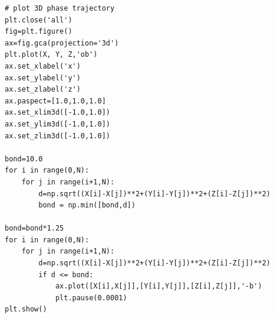 \begin{verbatim}
# plot 3D phase trajectory
plt.close('all')
fig=plt.figure()
ax=fig.gca(projection='3d')
plt.plot(X, Y, Z,'ob')
ax.set_xlabel('x')
ax.set_ylabel('y')
ax.set_zlabel('z')
ax.paspect=[1.0,1.0,1.0]
ax.set_xlim3d([-1.0,1.0])
ax.set_ylim3d([-1.0,1.0])
ax.set_zlim3d([-1.0,1.0])

bond=10.0
for i in range(0,N):
    for j in range(i+1,N):
        d=np.sqrt((X[i]-X[j])**2+(Y[i]-Y[j])**2+(Z[i]-Z[j])**2)
        bond = np.min([bond,d])

bond=bond*1.25
for i in range(0,N):
    for j in range(i+1,N):
        d=np.sqrt((X[i]-X[j])**2+(Y[i]-Y[j])**2+(Z[i]-Z[j])**2)
        if d <= bond:
            ax.plot([X[i],X[j]],[Y[i],Y[j]],[Z[i],Z[j]],'-b')
            plt.pause(0.0001)
plt.show()
\end{verbatim}
\normalsize

\vfill

\newpage



